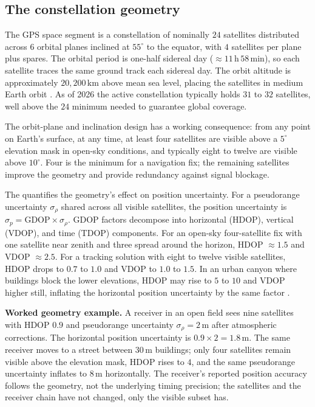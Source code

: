 \subsection{The constellation geometry}

The GPS space segment is a constellation of nominally $24$
satellites distributed across $6$ orbital planes inclined at
$55^{\circ}$ to the equator, with $4$ satellites per plane plus
spares. The orbital period is one-half sidereal day ($\approx 11
\,\si{\hour}\,58\,\si{\minute}$), so each satellite traces the same
ground track each sidereal day. The orbit altitude is approximately
$20{,}200 \,\si{\kilo\meter}$ above mean sea level, placing the
satellites in medium Earth orbit
\cite{text:ch06t3-kaplan-hegarty-2017}. As of 2026 the active
constellation typically holds $31$ to $32$ satellites, well above
the $24$ minimum needed to guarantee global coverage.

The orbit-plane and inclination design has a working consequence:
from any point on Earth's surface, at any time, at least four
satellites are visible above a $5^{\circ}$ elevation mask in
open-sky conditions, and typically eight to twelve are visible
above $10^{\circ}$. Four is the minimum for a navigation fix; the
remaining satellites improve the geometry and provide redundancy
against signal blockage.

The  quantifies the
geometry's effect on position uncertainty. For a pseudorange
uncertainty $\sigma_{\rho}$ shared across all visible satellites,
the position uncertainty is $\sigma_{p} = \mathrm{GDOP} \times
\sigma_{\rho}$. GDOP factors decompose into horizontal (HDOP),
vertical (VDOP), and time (TDOP) components. For an open-sky
four-satellite fix with one satellite near zenith and three
spread around the horizon, HDOP $\approx 1.5$ and VDOP $\approx
2.5$. For a tracking solution with eight to twelve visible
satellites, HDOP drops to $0.7$ to $1.0$ and VDOP to $1.0$ to
$1.5$. In an urban canyon where buildings block the lower
elevations, HDOP may rise to $5$ to $10$ and VDOP higher still,
inflating the horizontal position uncertainty by the same factor
\cite{text:ch06-misra-enge-2011}.

\textbf{Worked geometry example.} A receiver in an open field sees
nine satellites with HDOP $0.9$ and pseudorange uncertainty $\sigma
_{\rho} = 2 \,\si{\meter}$ after atmospheric corrections. The
horizontal position uncertainty is $0.9 \times 2 = 1.8 \,\si
{\meter}$. The same receiver moves to a street between $30 \,\si
{\meter}$ buildings; only four satellites remain visible above the
elevation mask, HDOP rises to $4$, and the same pseudorange
uncertainty inflates to $8 \,\si{\meter}$ horizontally. The
receiver's reported position accuracy follows the geometry, not
the underlying timing precision; the satellites and the receiver
chain have not changed, only the visible subset has.

